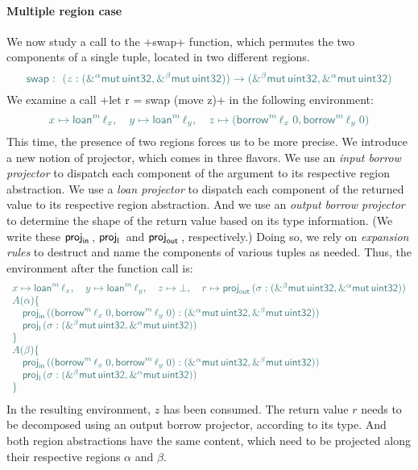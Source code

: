 \documentclass[acmsmall,screen]{acmart}
\newcommand\kw[1]{\ensuremath{\mathsf{#1}}}
\newcommand\tmbrw[2]{\ensuremath{\mathsf{\&}^#1\mathsf{mut}\,#2}}
\newcommand\emborrow[2]{\ensuremath{\mathsf{borrow}^m\,#1\;#2}}
\newcommand\emloan[1]{\ensuremath{\mathsf{loan}^m\,#1}}
\newcommand\elproj[1]{\ensuremath{\kw{proj}_\mathsf{l}\,#1}}
\newcommand\ebproj[1]{\ensuremath{\kw{proj}_\mathsf{out}\,#1}}
\let\eoproj\ebproj
\newcommand\eiproj[1]{\ensuremath{\kw{proj}_\mathsf{in}\,#1}}
\newcommand\myparagraph[1]{\emph{#1}.\ }
\let\myparagraph\paragraph
\begin{document}
\myparagraph{Multiple region case}
We now study a call to the \li+swap+ function, which permutes the two components
of a single tuple, located in two different regions.
\small
\[
\color{envcolor}
\kw{swap}:\ (z: (\tmbrw\alpha{\kw{uint32}}, \tmbrw\beta{\kw{uint32}})) \to
(\tmbrw\beta{\kw{uint32}}, \tmbrw\alpha{\kw{uint32}})
\]
\normalsize
We examine a call \li+let r = swap (move z)+ in the following environment:
\small
\[
\color{envcolor}
  x \mapsto \emloan\ell_x,\quad
  y \mapsto \emloan\ell_y,\quad
  z \mapsto (\emborrow{\ell_x}0, \emborrow{\ell_y}0)
\]
\normalsize
This time, the presence of two regions forces us to be more precise. We
introduce a new notion of projector, which comes in three flavors. We use an
\emph{input borrow projector} to dispatch each component of the argument to
its respective region abstraction. We use a \emph{loan projector} to dispatch each component
of the returned value to its respective region abstraction. And we use an
\emph{output borrow
projector} to determine the shape of the return value based on its type
information. (We write these $\eiproj\relax$, $\elproj\relax$ and
$\eoproj\relax$, respectively.)
Doing so, we rely on \emph{expansion rules} to
destruct and name the components of various tuples as needed. Thus, the
environment after the function call is:
\small
\[
\color{envcolor}
\begin{array}{l}
  x \mapsto \emloan\ell_x,\quad
  y \mapsto \emloan\ell_y,\quad
  z \mapsto \bot,\quad
  r \mapsto \ebproj(\sigma:
      (\tmbrw\beta{\kw{uint32}}, \tmbrw\alpha{\kw{uint32}})) \\
  A(\alpha) \{\\
    \quad \eiproj ((\emborrow{\ell_x}0, \emborrow{\ell_y}0):
      (\tmbrw\alpha{\kw{uint32}}, \tmbrw\beta{\kw{uint32}})) \\
    \quad \elproj (\sigma:
      (\tmbrw\beta{\kw{uint32}}, \tmbrw\alpha{\kw{uint32}})) \\
  \} \\
  A(\beta) \{\\
    \quad \eiproj ((\emborrow{\ell_x}0, \emborrow{\ell_y}0):
      (\tmbrw\alpha{\kw{uint32}}, \tmbrw\beta{\kw{uint32}})) \\
    \quad \elproj (\sigma:
      (\tmbrw\beta{\kw{uint32}}, \tmbrw\alpha{\kw{uint32}})) \\
  \}
\end{array}
\]
\normalsize
In the resulting environment, $z$ has been consumed. The return value $r$ needs
to be decomposed using an output borrow projector, according to its type. And
both region abstractions have the same content, which need to be projected along their
respective regions $\alpha$ and $\beta$.
\end{document}
